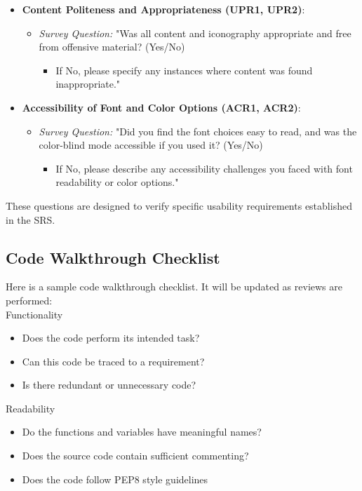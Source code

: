 \documentclass[12pt, titlepage]{article}
\begin{document}
\begin{itemize}
    \item \textbf{Content Politeness and Appropriateness (UPR1, UPR2)}:
    \begin{itemize}
        \item \textit{Survey Question:} "Was all content and iconography appropriate and free from offensive material? (Yes/No)  
        \begin{itemize}
            \item If No, please specify any instances where content was found inappropriate."
        \end{itemize}
    \end{itemize}

    \item \textbf{Accessibility of Font and Color Options (ACR1, ACR2)}:
    \begin{itemize}
        \item \textit{Survey Question:} "Did you find the font choices easy to read, and was the color-blind mode accessible if you used it? (Yes/No)  
        \begin{itemize}
            \item If No, please describe any accessibility challenges you faced with font readability or color options."
        \end{itemize}
    \end{itemize}
\end{itemize}

\noindent
These questions are designed to verify specific usability requirements established in the SRS.


\subsection{Code Walkthrough Checklist}
\label{A-Code-walkthrough-checklist}
Here is a sample code walkthrough checklist. It will be updated as reviews are performed:\\

\noindent
Functionality
\begin{itemize}[label=$\square$]
  \item Does the code perform its intended task?
  \item Can this code be traced to a requirement?
  \item Is there redundant or unnecessary code?
\end{itemize}

\noindent
Readability
\begin{itemize}[label=$\square$]
  \item Do the functions and variables have meaningful names?
  \item Does the source code contain sufficient commenting?
  \item Does the code follow PEP8 style guidelines
\end{itemize}
\end{document}
